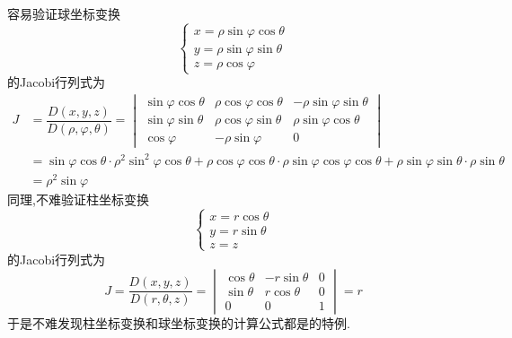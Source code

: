 \documentclass{ctexart}
\begin{document}
容易验证球坐标变换
\[\left\{\begin{array}{l}
    x=\rho\sin\varphi\cos\theta\\
    y=\rho\sin\varphi\sin\theta\\
    z=\rho\cos\varphi
\end{array}\right.\]的Jacobi行列式为
\[\begin{aligned}
    J
    &= \dfrac{D(x,y,z)}{D(\rho,\varphi,\theta)}
    = \begin{vmatrix}
        \sin\varphi\cos\theta & \rho\cos\varphi\cos\theta & -\rho\sin\varphi\sin\theta \\
        \sin\varphi\sin\theta & \rho\cos\varphi\sin\theta & \rho\sin\varphi\cos\theta \\
        \cos\varphi & -\rho\sin\varphi & 0
    \end{vmatrix} \\
    &= \sin\varphi\cos\theta\cdot\rho^2\sin^2\varphi\cos\theta + \rho\cos\varphi\cos\theta\cdot\rho\sin\varphi\cos\varphi\cos\theta + \rho\sin\varphi\sin\theta\cdot\rho\sin\theta \\
    &= \rho^2\sin\varphi
\end{aligned}\]
同理,不难验证柱坐标变换
\[\left\{\begin{array}{l}
    x=r\cos\theta\\
    y=r\sin\theta\\
    z=z
\end{array}\right.\]
的Jacobi行列式为
\[J=\dfrac{D(x,y,z)}{D(r,\theta,z)}=
\begin{vmatrix}
    \cos\theta & -r\sin\theta & 0 \\
    \sin\theta & r\cos\theta & 0 \\
    0 & 0 & 1
\end{vmatrix}=r\]
于是不难发现柱坐标变换和球坐标变换的计算公式都是的特例.
\end{document}
